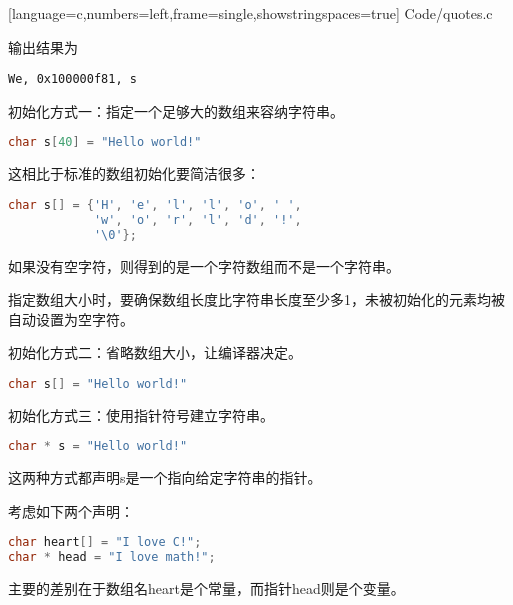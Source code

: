\begin{frame}[fragile]

[language=c,numbers=left,frame=single,showstringspaces=true]
{Code/quotes.c}
\pause \vspace{0.1in}

输出结果为
\begin{lstlisting}[basicstyle=\ttfamily,showspaces=true]
We, 0x100000f81, s
\end{lstlisting}
\end{frame}

\begin{frame}[fragile]
初始化方式一：指定一个足够大的数组来容纳字符串。
\begin{lstlisting}[language=c]
char s[40] = "Hello world!"
\end{lstlisting} \pause \vspace{0.1in}

这相比于标准的数组初始化要简洁很多：
\begin{lstlisting}[language=c]
char s[] = {'H', 'e', 'l', 'l', 'o', ' ', 
            'w', 'o', 'r', 'l', 'd', '!', 
            '\0'};
\end{lstlisting}
如果没有空字符，则得到的是一个字符数组而不是一个字符串。
\end{frame}

\begin{frame}[fragile]
\textcolor{acolor1}{指定数组大小时，要确保数组长度比字符串长度至少多1，未被初始化的元素均被自动设置为空字符。}
\end{frame}

\begin{frame}[fragile]
初始化方式二：省略数组大小，让编译器决定。
\begin{lstlisting}[language=c,showstringspaces=true]
char s[] = "Hello world!"
\end{lstlisting} \pause \vspace{0.1in}

初始化方式三：使用指针符号建立字符串。
\begin{lstlisting}[language=c,showstringspaces=true]
char * s = "Hello world!"
\end{lstlisting} \pause \vspace{0.1in}

这两种方式都声明s是一个指向给定字符串的指针。
\end{frame}

\begin{frame}[fragile]
考虑如下两个声明：
\begin{lstlisting}[language=c,showstringspaces=true]
char heart[] = "I love C!";
char * head = "I love math!";
\end{lstlisting}
\vspace{0.1in}

主要的差别在于数组名heart是个常量，而指针head则是个变量。
\end{frame}

